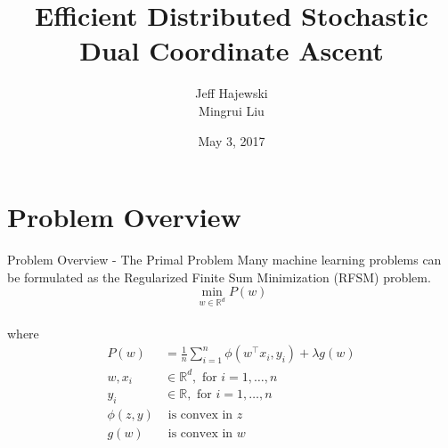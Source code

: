 \documentclass{beamer}
\title{Efficient Distributed Stochastic Dual Coordinate Ascent} %
\author{Jeff Hajewski \\ Mingrui Liu}
\date{May 3, 2017}
\institute{University of Iowa}
\def \R {\mathbb{R}}
\def \R {\mathbb{R}}
\begin{document}
	
	\begin{frame}
		\titlepage %
	\end{frame}
	
	
	
\section{Problem Overview}
\begin{frame}{Problem Overview - The Primal Problem}
	Many machine learning problems can be formulated as the Regularized Finite Sum Minimization (RFSM) problem.
  \vspace{1em}
	\begin{equation}
		\label{RLM}
		\min_{w\in\R^d}P(w)
	\end{equation}
  \vspace{1.5em}\\
  where 
  \begin{align*}
    P(w) &= \frac{1}{n}\sum_{i=1}^{n}\phi(w^\top x_i,y_i)+\lambda g(w)\\
    w, x_i & \in \R^d, \text{ for } i = 1, \dots, n\\
    y_i & \in \R, \text{ for } i = 1, \dots, n\\
    \phi(z,y) & \text{ is convex in $z$}\\
    g(w) & \text{ is convex in $w$}\\
  \end{align*}
  
\end{frame}
\end{document}
